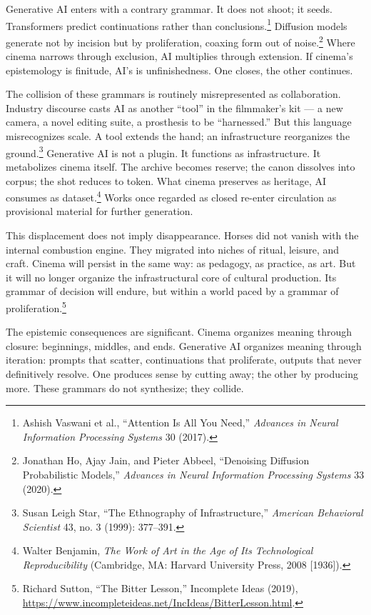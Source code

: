 \documentclass[11pt]{article}
\begin{document}
Generative AI enters with a contrary grammar. It does not shoot; it seeds. Transformers predict continuations rather than conclusions.\footnote{Ashish Vaswani et al., ``Attention Is All You Need,'' \textit{Advances in Neural Information Processing Systems} 30 (2017).} Diffusion models generate not by incision but by proliferation, coaxing form out of noise.\footnote{Jonathan Ho, Ajay Jain, and Pieter Abbeel, ``Denoising Diffusion Probabilistic Models,'' \textit{Advances in Neural Information Processing Systems} 33 (2020).} Where cinema narrows through exclusion, AI multiplies through extension. If cinema's epistemology is finitude, AI's is unfinishedness. One closes, the other continues.

The collision of these grammars is routinely misrepresented as collaboration. Industry discourse casts AI as another ``tool'' in the filmmaker's kit --- a new camera, a novel editing suite, a prosthesis to be ``harnessed.'' But this language misrecognizes scale. A tool extends the hand; an infrastructure reorganizes the ground.\footnote{Susan Leigh Star, ``The Ethnography of Infrastructure,'' \textit{American Behavioral Scientist} 43, no. 3 (1999): 377--391.} Generative AI is not a plugin. It functions as infrastructure. It metabolizes cinema itself. The archive becomes reserve; the canon dissolves into corpus; the shot reduces to token. What cinema preserves as heritage, AI consumes as dataset.\footnote{Walter Benjamin, \textit{The Work of Art in the Age of Its Technological Reproducibility} (Cambridge, MA: Harvard University Press, 2008 [1936]).} Works once regarded as closed re-enter circulation as provisional material for further generation.

This displacement does not imply disappearance. Horses did not vanish with the internal combustion engine. They migrated into niches of ritual, leisure, and craft. Cinema will persist in the same way: as pedagogy, as practice, as art. But it will no longer organize the infrastructural core of cultural production. Its grammar of decision will endure, but within a world paced by a grammar of proliferation.\footnote{Richard Sutton, ``The Bitter Lesson,'' Incomplete Ideas (2019), \url{https://www.incompleteideas.net/IncIdeas/BitterLesson.html}.}

The epistemic consequences are significant. Cinema organizes meaning through closure: beginnings, middles, and ends. Generative AI organizes meaning through iteration: prompts that scatter, continuations that proliferate, outputs that never definitively resolve. One produces sense by cutting away; the other by producing more. These grammars do not synthesize; they collide.
\end{document}
